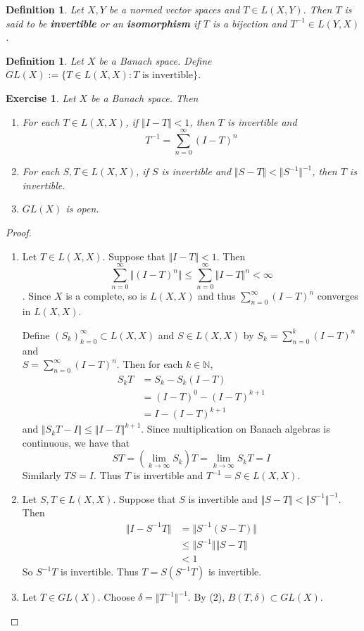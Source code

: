 \documentclass[12pt]{amsart}
\newtheorem{defn}[thm]{Definition}
\newtheorem{ex}[thm]{Exercise}
\newcommand{\del}{\delta}
\newcommand{\N}{\mathbb{N}}
\newcommand{\n}{\Vert}
\begin{document}
\begin{defn}
Let $X,Y$ be a normed vector spaces and $T \in L(X,Y)$. Then $T$ is said to be \textbf{invertible} or an \textbf{isomorphism} if $T$ is a bijection and $T^{-1} \in L(Y,X)$.
\end{defn}

\begin{defn}
Let $X$ be a Banach space. Define $GL(X) := \{T \in L(X,X): T \text{ is invertible}\}$.
\end{defn}

\begin{ex}
Let $X$ be a Banach space. Then 
\begin{enumerate}
\item For each $T \in L(X,X)$, if $\n I- T \n < 1$, then $T$ is invertible and $$T^{-1} = \sum_{n=0}^{\infty}(I-T)^n$$
\item For each $S,T \in L(X,X)$, if $S$ is invertible and $\n S-T \n < \n S^{-1} \n^{-1}$, then $T$ is invertible. 
\item $GL(X)$ is open.
\end{enumerate}
\end{ex}

\begin{proof}
\begin{enumerate}
\item Let $T \in L(X,X)$. Suppose that $\n I-T \n < 1$. Then $$\sum_{n=0}^{\infty} \n (I -T)^n \n  \leq \sum_{n=0}^{\infty} \n I -T \n ^{n} < \infty$$. Since $X$ is a complete, so is $L(X,X)$ and thus $\sum\limits_{n=0}^{\infty}(I-T)^n$ converges in $L(X,X)$.

Define $(S_k)_{k=0}^{\infty} \subset L(X,X)$ and $S \in L(X,X)$ by $S_k = \sum\limits_{n=0}^{k} (I-T)^n$ and \\ $S = \sum\limits_{n=0}^{\infty}(I-T)^n$. Then for each $k \in \N$,
\begin{align*}
S_k T
&= S_k - S_k(I-T) \\
&= (I-T)^0 - (I-T)^{k+1} \\
&= I - (I-T)^{k+1}
\end{align*}
and $\n S_kT - I \n \leq \n I-T \n ^{k+1}$. Since multiplication on Banach algebras is continuous, we have that $$ST = (\lim_{k \rightarrow \infty} S_k)T = \lim\limits_{k \rightarrow \infty}S_kT = I$$
Similarly $TS = I$. Thus $T$ is invertible and $T^{-1} = S \in L(X,X)$. \vspace{.5cm}\\
\item  Let $S, T \in L(X,X)$. Suppose that $S$ is invertible and $\n S-T \n < \n S^{-1} \n ^{-1}$. Then 
\begin{align*}
\n I - S^{-1}T \n
& = \n S^{-1}(S - T) \n \\
& \leq \n S^{-1} \n \n S -T \n \\
&< 1
\end{align*}
So $S^{-1}T$ is invertible. Thus $T = S (S^{-1}T)$ is invertible. \vspace{.5cm}\\
\item Let $T \in GL(X)$. Choose $\del = \n T^{-1}\n^{-1}$. By (2), $B(T, \del) \subset GL(X)$.
\end{enumerate}
\end{proof}
\end{document}
